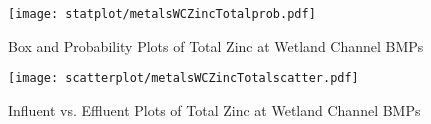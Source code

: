         \begin{figure}[hb]   %
            \centering
            \texttt{[image: statplot/metalsWCZincTotalprob.pdf]}
            \caption{Box and Probability Plots of Total Zinc at Wetland Channel BMPs}
        \end{figure}         %
        
        
        \begin{figure}[hb]   %
            \centering
            \texttt{[image: scatterplot/metalsWCZincTotalscatter.pdf]}
            \caption{Influent vs. Effluent Plots of Total Zinc at Wetland Channel BMPs}
        \end{figure}         %
        \clearpage
        